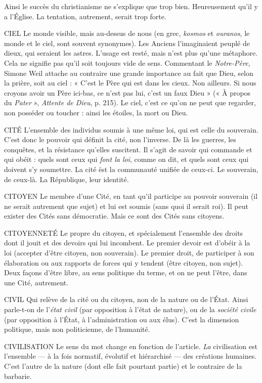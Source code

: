 Ainsi le succès du christianisme ne s’explique que trop bien. Heureusement
qu’il y a l’Église. La tentation, autrement, serait trop forte.

CIEL Le monde visible, mais au-dessus de nous (en grec, {\it kosmos} et {\it ouranos},
le monde et le ciel, sont souvent synonymes). Les Anciens l'imaginaient
peuplé de dieux, qui seraient les astres. L’usage est resté, mais n’est plus
qu'une métaphore. Cela ne signifie pas qu’il soit toujours vide de sens. Commentant
le {\it Notre-Père}, Simone Weil attache au contraire une grande importance
au fait que Dieu, selon la prière, soit au ciel : « C’est le Père qui est dans
les cieux. Non ailleurs. Si nous croyons avoir un Père ici-bas, ce n’est pas lui,
c'est un faux Dieu » (« À propos du {\it Pater} », {\it Attente de Dieu}, p. 215). Le ciel,
c’est ce qu’on ne peut que regarder, non posséder ou toucher : ainsi les étoiles,
la mort ou Dieu.

CITÉ L'ensemble des individus soumis à une même loi, qui est celle du
souverain. C’est donc le pouvoir qui définit la cité, non l’inverse. De
là les guerres, les conquêtes, et la résistance qu’elles suscitent. Il s’agit de savoir
qui commande et qui obéit : quels sont ceux qui {\it font la loi}, comme on dit, et
quels sont ceux qui doivent s’y soumettre. La cité ëst la communauté unifiée de
ceux-ci. Le souverain, de ceux-là. La République, leur identité.

CITOYEN Le membre d’une Cité, en tant qu’il participe au pouvoir souverain
(il ne serait autrement que sujet) et lui est soumis (sans quoi
il serait roi).
Il peut exister des Cités sans démocratie. Mais ce sont des Cités sans
citoyens.

CITOYENNETÉ Le propre du citoyen, et spécialement l’ensemble des
droits dont il jouit et des devoirs qui lui incombent. Le
premier devoir est d’obéir à la loi (accepter d’être citoyen, non souverain). Le
premier droit, de participer à son élaboration ou aux rapports de forces qui y
tendent (être citoyen, non sujet). Deux façons d’être libre, au sens politique du
terme, et on ne peut l'être, dans une Cité, autrement.

CIVIL Qui relève de la cité ou du citoyen, non de la nature ou de l’État.
Ainsi parle-t-on de l’{\it état civil} (par opposition à l’état de nature), ou
de la {\it société civile} (par opposition à l’État, à l'administration ou aux élus). C’est
la dimension politique, mais non politicienne, de l’humanité.

CIVILISATION Le sens du mot change en fonction de l’article.
{\it La} civilisation est l’ensemble — à la fois normatif, évolutif
et hiérarchisé — des créations humaines. C’est l’autre de la nature (dont elle fait
pourtant partie) et le contraire de la barbarie.

